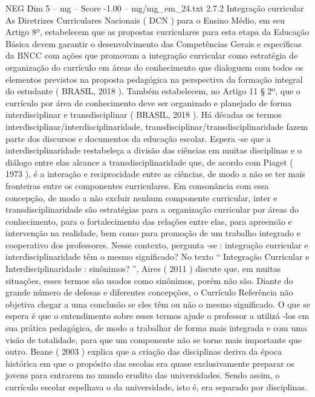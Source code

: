 \begin{textsample}{NEG Dim 5 – mg – Score -1.00 – mg/mg\_em\_24.txt}  \label{ex:f5_neg_102}
2.7.2 Integração curricular As Diretrizes Curriculares Nacionais ( DCN ) para o Ensino Médio, em seu Artigo 8º, estabelecem que as propostas curriculares para esta etapa da Educação Básica devem garantir o desenvolvimento das Competências Gerais e específicas da BNCC com ações que promovam a integração curricular como estratégia de organização do currículo em áreas do conhecimento que dialoguem com todos os elementos previstos na proposta pedagógica na perspectiva da formação integral do estudante ( BRASIL, 2018 ).
Também estabelecem, no Artigo 11 § 2º, que o currículo por área de conhecimento deve ser organizado e planejado de forma interdisciplinar e transdisciplinar ( BRASIL, 2018 ).
Há décadas os termos interdisciplinar/interdisciplinaridade, transdisciplinar/transdisciplinaridade fazem parte dos discursos e documentos da educação escolar.
Espera -se que a interdisciplinaridade restabeleça a divisão das ciências em muitas disciplinas e o diálogo entre elas alcance a transdisciplinaridade que, de acordo com Piaget ( 1973 ), é a interação e reciprocidade entre as ciências, de modo a não se ter mais fronteiras entre os componentes curriculares.
Em consonância com essa concepção, de modo a não excluir nenhum componente curricular, inter e transdisciplinaridade são estratégias para a organização curricular por áreas do conhecimento, para o fortalecimento das relações entre elas, para apreensão e intervenção na realidade, bem como para promoção de um trabalho integrado e cooperativo dos professores.
Nesse contexto, pergunta -se : integração curricular e interdisciplinaridade têm o mesmo significado?
No texto “ Integração Curricular e Interdisciplinaridade : sinônimos? ”, Aires ( 2011 ) discute que, em muitas situações, esses termos são usados como sinônimos, porém não são.
Diante do grande número de defesas e diferentes concepções, o Currículo Referência não objetiva chegar a uma conclusão se eles têm ou não o mesmo significado.
O que se espera é que o entendimento sobre esses termos ajude o professor a utilizá -los em sua prática pedagógica, de modo a trabalhar de forma mais integrada e com uma visão de totalidade, para que um componente não se torne mais importante que outro.
Beane ( 2003 ) explica que a criação das disciplinas deriva da época histórica em que o propósito das escolas era quase exclusivamente preparar os jovens para entrarem no mundo erudito das universidades.
Sendo assim, o currículo escolar espelhava o da universidade, isto é, era separado por disciplinas.

\end{textsample}
